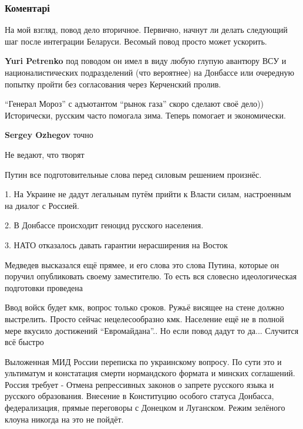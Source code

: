 
 
 
 
 
\subsubsection{Коментарі}
\label{sec:15_12_2021.fb.voloshin_oleg.opzzh.1.vtorzhenie_rossia.cmt}

\begin{itemize} %
На мой взгляд, повод дело вторичное. Первично, начнут ли делать следующий шаг после интеграции Беларуси. Весомый повод просто может ускорить.


\textbf{Yuri Petrenko} под поводом он имел в виду любую глупую авантюру ВСУ и националистических подразделений (что вероятнее) на Донбассе или очередную попытку пройти без согласования через Керченский пролив.

\enquote{Генерал Мороз} с адъютантом \enquote{рынок газа} скоро сделают своё дело))
Исторически, русским часто помогала зима.
Теперь помогает и экономически.

\textbf{Sergey Ozhegov} точно

Не ведают, что творят


Путин все подготовительные слова перед силовым решением произнёс.

1. На Украине не дадут легальным путём прийти к Власти силам, настроенным на
диалог с Россией.

2. В Донбассе происходит геноцид русского населения.

3. НАТО отказалось давать гарантии нерасширения на Восток

Медведев высказался ещё прямее, и его слова это слова Путина, которые он
поручил опубликовать своему заместителю.  То есть вся словесно идеологическая
подготовки проведена

Ввод войск будет кмк, вопрос только сроков.
Ружьё висящее на стене должно выстрелить.
Просто сейчас нецелесообразно кмк.
Население ещё не в полной мере вкусило достижений \enquote{Евромайдана}..
Но если повод дадут то да... Случится всё быстро

Выложенная МИД России переписка по украинскому вопросу.
По сути это и ультиматум и констатация смерти нормандского формата и минских соглашений.
Россия требует -
Отмена репрессивных законов о запрете русского языка и русского образования. Внесение в Конституцию особого статуса Донбасса, федерализация, прямые переговоры с Донецком и Луганском.
Режим зелёного клоуна никогда на это не пойдёт.

\end{itemize} %
